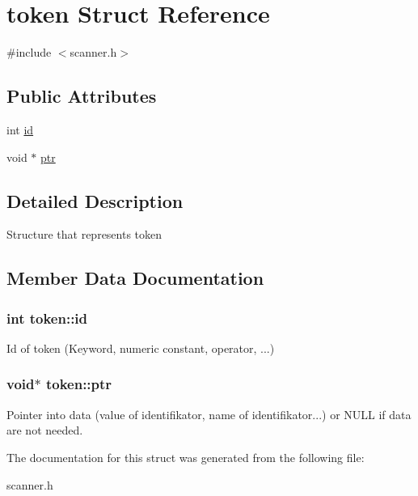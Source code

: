 \hypertarget{structtoken}{}\section{token Struct Reference}
\label{structtoken}


{\ttfamily \#include $<$scanner.\+h$>$}

\subsection*{Public Attributes}
\begin{DoxyCompactItemize}
\item 
int \hyperlink{structtoken_a0bb5b4fb1d645554ebecfd03eeb24f93}{id}
\item 
void $\ast$ \hyperlink{structtoken_a10ee4b9954a7330aeabf87082fee7bbd}{ptr}
\end{DoxyCompactItemize}


\subsection{Detailed Description}
Structure that represents token 

\subsection{Member Data Documentation}
\subsubsection[{\texorpdfstring{id}{id}}]{\setlength{\rightskip}{0pt plus 5cm}int token\+::id}\hypertarget{structtoken_a0bb5b4fb1d645554ebecfd03eeb24f93}{}\label{structtoken_a0bb5b4fb1d645554ebecfd03eeb24f93}
Id of token (Keyword, numeric constant, operator, ...) 
\subsubsection[{\texorpdfstring{ptr}{ptr}}]{\setlength{\rightskip}{0pt plus 5cm}void$\ast$ token\+::ptr}\hypertarget{structtoken_a10ee4b9954a7330aeabf87082fee7bbd}{}\label{structtoken_a10ee4b9954a7330aeabf87082fee7bbd}
Pointer into data (value of identifikator, name of identifikator...) or N\+U\+LL if data are not needed. 

The documentation for this struct was generated from the following file\+:\begin{DoxyCompactItemize}
\item 
scanner.\+h\end{DoxyCompactItemize}
